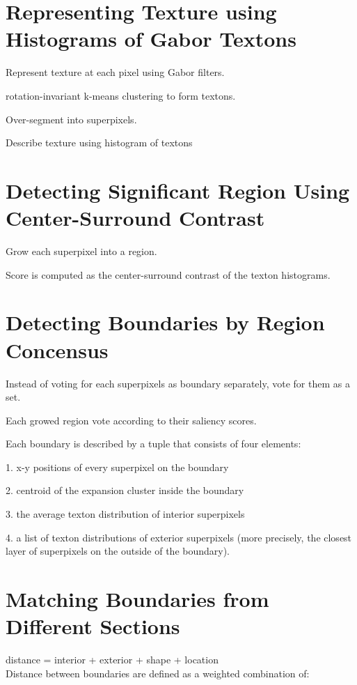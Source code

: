 \documentclass{llncs}
\begin{document}
\section{Representing Texture using Histograms of Gabor Textons}

Represent texture at each pixel using Gabor filters.

rotation-invariant k-means clustering to form textons.

Over-segment into superpixels.

Describe texture using histogram of textons


\section{Detecting Significant Region Using Center-Surround Contrast}

Grow each superpixel into a region.

Score is computed as the center-surround contrast of the texton histograms.


\section{Detecting Boundaries by Region Concensus}

Instead of voting for each superpixels as boundary separately, vote for them as a set.

Each growed region vote according to their saliency scores.

Each boundary is described by a tuple that consists of four elements:

1. x-y positions of every superpixel on the boundary

2. centroid of the expansion cluster inside the boundary

3. the average texton distribution of interior superpixels

4. a list of texton distributions of exterior superpixels (more precisely, the closest layer of superpixels on the outside of the boundary).

\section{Matching Boundaries from Different Sections}

distance = interior + exterior + shape + location 
\\

Distance between boundaries are defined as a weighted combination of:
\end{document}
